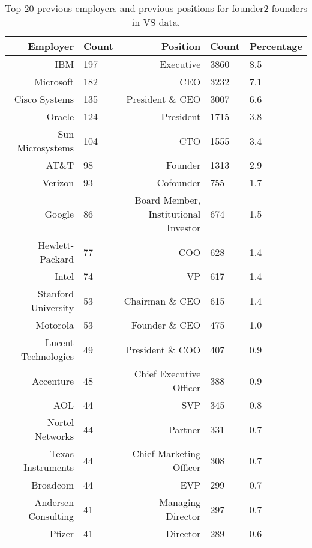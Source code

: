 \begin{table}[]
\centering
\begingroup\normalsize
\begin{tabular}{rlrll}
  \toprule
Employer & Count & Position & Count & Percentage \\ 
  \midrule
IBM & 197 & Executive & 3860 & 8.5 \\ 
  Microsoft & 182 & CEO & 3232 & 7.1 \\ 
  Cisco Systems & 135 & President \& CEO & 3007 & 6.6 \\ 
  Oracle & 124 & President & 1715 & 3.8 \\ 
  Sun Microsystems & 104 & CTO & 1555 & 3.4 \\ 
  AT\&T & 98 & Founder & 1313 & 2.9 \\ 
  Verizon & 93 & Cofounder & 755 & 1.7 \\ 
  Google & 86 & Board Member, Institutional Investor & 674 & 1.5 \\ 
  Hewlett-Packard & 77 & COO & 628 & 1.4 \\ 
  Intel & 74 & VP & 617 & 1.4 \\ 
  Stanford University & 53 & Chairman \& CEO & 615 & 1.4 \\ 
  Motorola & 53 & Founder \& CEO & 475 & 1.0 \\ 
  Lucent Technologies & 49 & President \& COO & 407 & 0.9 \\ 
  Accenture & 48 & Chief Executive Officer & 388 & 0.9 \\ 
  AOL & 44 & SVP & 345 & 0.8 \\ 
  Nortel Networks & 44 & Partner & 331 & 0.7 \\ 
  Texas Instruments & 44 & Chief Marketing Officer & 308 & 0.7 \\ 
  Broadcom & 44 & EVP & 299 & 0.7 \\ 
  Andersen Consulting & 41 & Managing Director & 297 & 0.7 \\ 
  Pfizer & 41 & Director & 289 & 0.6 \\ 
   \bottomrule
\end{tabular}
\endgroup
\caption{Top 20 previous employers and previous positions for founder2 founders in VS data.} 
\label{table:VS_previousEmployersSummaryTable}
\end{table}
